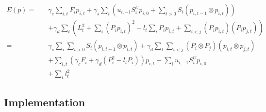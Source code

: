 \begin{subequations}
\begin{align}
  E(p) = \quad
  &
  \gamma_c \sum_{i, t} F_i p_{i, t}
  + \gamma_s \sum_i \left(
      u_{i, -1} S_i^U p_{i, 0}
      + \sum_{t > 0} S_i \left( p_{i, t-1} \otimes p_{i, t} \right)
    \right)
  \\ &
  + \gamma_d \sum_t \left(
    L_t^2
    + \sum_i \left( P_i p_{i, t} \right)^2 - l_t \sum_i P_i p_{i, t}
    + \sum_{i < j} \left( P_i p_{i, t} \right) \left( P_i p_{j, t} \right)
  \right) \\
  = \quad
  &
  \gamma_s \sum_i \sum_{t > 0} S_i \left( p_{i, t-1} \otimes p_{i, t} \right)
  + \gamma_d \sum_t \sum_{i < j} \left( P_i \otimes P_j \right) \left( p_{i, t} \otimes p_{j, t} \right)
  \\ &
  + \sum_{i, t} \left(
    \gamma_c F_i + \gamma_d \left(P_i^2 - l_t P_i \right)
  \right) p_{i, t}
  + \sum_i u_{i, -1} S_i^U p_{i, 0}
  \\ &
  + \sum_t l_t^2
\end{align}
\end{subequations}


\subsection{Implementation}


